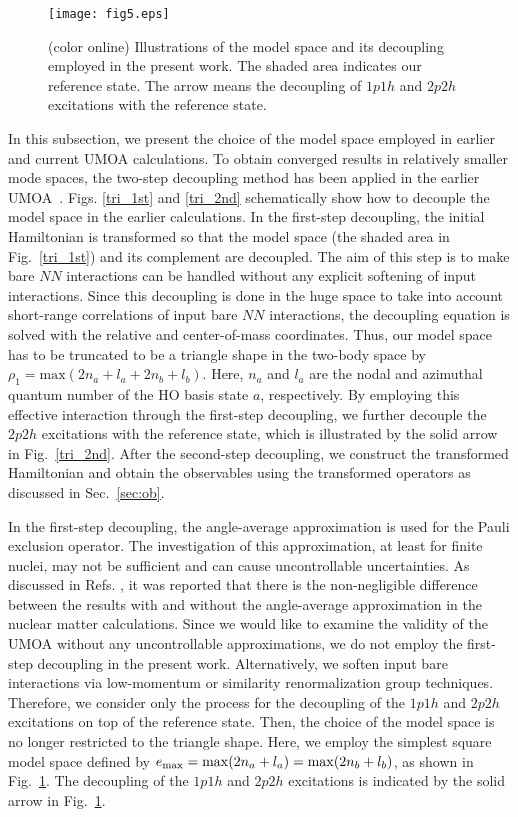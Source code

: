 \documentclass[aps,prc, dvips, twocolumn,groupedaddress,showkeys,showpacs,floatfix,superscriptaddress]{revtex4-1}
\newcommand{\<}{\langle}
\renewcommand{\>}{\rangle}
\begin{document}
\begin{figure}[t]
\texttt{[image: fig5.eps]}
\caption{\label{squ}(color online) Illustrations of the model space and its decoupling employed in the present work.
 The shaded area indicates our reference state. The arrow means the decoupling of $1p1h$
  and $2p2h$ excitations with the reference state.}
\end{figure}
In this subsection, we present the choice of the model space employed in earlier and current UMOA calculations.
To obtain converged results in relatively smaller mode spaces, the two-step
 decoupling method has been applied in the earlier UMOA~\cite{Fujii:2004,Fujii:2009}.
 Figs. \ref{tri_1st} and \ref{tri_2nd} schematically show how to decouple the model space in the earlier calculations.
In the first-step decoupling, the initial Hamiltonian is transformed
so that the model space (the shaded area in Fig.~\ref{tri_1st}) and its complement are decoupled.
The aim of this step is to make bare $NN$ interactions can be handled without any explicit softening of input interactions.
Since this decoupling is done in the huge space to take into
 account short-range correlations of input bare $NN$ interactions, the
 decoupling equation is solved with the relative and center-of-mass coordinates.
Thus, our model space has to be truncated to be a triangle shape in the two-body space by
 $\rho_{1}=\text{max}(2n_{a}+l_{a}+2n_{b}+l_{b})$.
Here, $n_{a}$ and $l_{a}$ are the nodal and azimuthal quantum number of the
 HO basis state $a$, respectively.
By employing this effective interaction through the first-step decoupling,
 we further decouple the $2p2h$ excitations with the reference state, which is
 illustrated by the solid arrow in Fig.~\ref{tri_2nd}.
After the second-step decoupling, we construct the transformed Hamiltonian
 and obtain the observables using the
 transformed operators as discussed in Sec.~\ref{sec:ob}.

In the first-step decoupling, the angle-average approximation is
 used for the Pauli exclusion operator.
The investigation of this approximation, at least for finite nuclei, may not be sufficient
 and can cause uncontrollable uncertainties.
 As discussed in Refs. \cite{Schiller:1999, Suzuki:2000, Baardsen:2013},
it was reported that there is the
  non-negligible difference between the results with and without the angle-average approximation
  in the nuclear matter calculations.
Since we would like to examine the validity of the UMOA without any uncontrollable approximations,
 we do not employ the first-step decoupling in the present work.
Alternatively, we soften input bare interactions via low-momentum or similarity renormalization group techniques.
Therefore, we consider only the process for the decoupling of the $1p1h$ and $2p2h$ excitations on top of the reference state.
Then, the choice of the model space is no longer restricted to the triangle shape.
Here, we employ the simplest square model space defined by
$e_{{\rm max}} = {\rm max}(2n_{a} + l_{a}) = {\rm max}(2n_{b}+l_{b})$, as shown in Fig.~\ref{squ}.
The decoupling of the $1p1h$ and $2p2h$ excitations is indicated by the solid arrow in Fig.~\ref{squ}.
\end{document}
